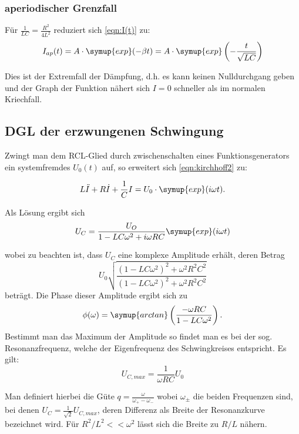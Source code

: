 \subsubsection{aperiodischer Grenzfall}
Für $\frac{1}{LC} = \frac{R^2}{4L^2}$ reduziert sich \eqref{eqn:I(t)} zu:
\begin{equation}
  I_{ap}(t)= A \cdot \symup{exp}(-\beta t) = A \cdot \symup{exp}\left(- \frac{t}{\sqrt{LC}}\right)
  \label{eqn:AP(t)}
\end{equation}

Dies ist der Extremfall der Dämpfung, d.h. es kann keinen Nulldurchgang geben und der Graph der Funktion nähert sich $I=0$ schneller als im normalen Kriechfall.

\subsection{DGL der erzwungenen Schwingung}
Zwingt man dem RCL-Glied durch zwischenschalten eines Funktionsgenerators ein systemfremdes $U_0(t)$ auf, so erweitert sich \eqref{eqn:kirchhoff2} zu:

\begin{equation}
  L \ddot{I} + R \dot{I} + \frac{1}{C} I = U_0 \cdot \symup{exp}(i \omega t).
\end{equation}

Als Lösung ergibt sich
\begin{equation}
  U_C = \frac{U_O}{1-LC \omega^2 + i\omega RC} \symup{exp}(i\omega t)
  \label{eqn:U_C}
\end{equation}

wobei zu beachten ist, dass $U_C$ eine komplexe Amplitude erhält, deren Betrag
\begin{equation*}
U_0 \sqrt{\frac{(1-LC\omega^2)^2+\omega^2 R^2 C^2}{(1-LC\omega^2)^2 + \omega^2 R^2 C^2}}
\end{equation*}
beträgt.
Die Phase dieser Amplitude ergibt sich zu
\begin{equation*}
\phi(\omega)=\symup{arctan}\left(\frac{-\omega RC}{1-LC\omega^2}\right).
\end{equation*}
Bestimmt man das Maximum der Amplitude so findet man es bei der sog. Resonanzfrequenz, welche der Eigenfrequenz \omega des Schwingkreises entspricht. Es gilt:
\begin{equation}
  U_{C,max} = \frac{1}{\omega RC} U_0
  \label{eqn:Resonanz}
\end{equation}

Man definiert hierbei die Güte $q=\frac{\omega}{\omega_+ - \omega_-}$ wobei $\omega_\pm$ die beiden Frequenzen sind,
bei denen $U_C = \frac{1}{\sqrt{2}} U_{C,max}$, deren Differenz als Breite der Resonanzkurve bezeichnet wird.
Für $R^2/L^2 << \omega^2$ lässt sich die Breite zu $R/L$ nähern.


